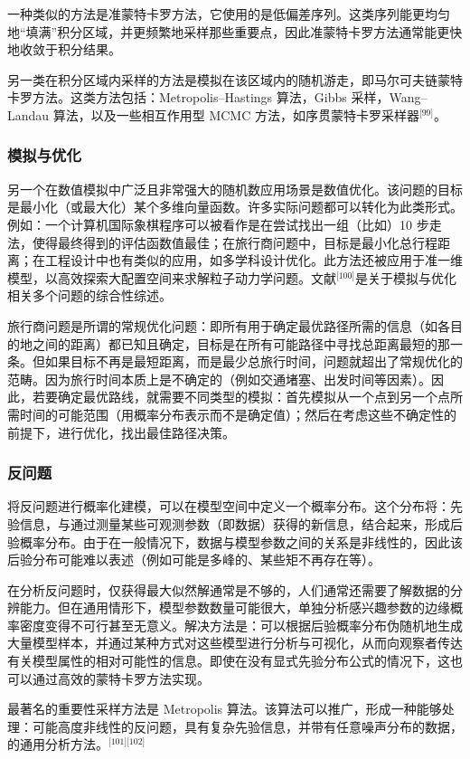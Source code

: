 一种类似的方法是准蒙特卡罗方法，它使用的是低偏差序列。这类序列能更均匀地“填满”积分区域，并更频繁地采样那些重要点，因此准蒙特卡罗方法通常能更快地收敛于积分结果。

另一类在积分区域内采样的方法是模拟在该区域内的随机游走，即马尔可夫链蒙特卡罗方法。这类方法包括：Metropolis–Hastings 算法，Gibbs 采样，Wang–Landau 算法，以及一些相互作用型 MCMC 方法，如序贯蒙特卡罗采样器\(^\text{[99]}\)。
\subsubsection{模拟与优化}
另一个在数值模拟中广泛且非常强大的随机数应用场景是数值优化。该问题的目标是最小化（或最大化）某个多维向量函数。许多实际问题都可以转化为此类形式。例如：一个计算机国际象棋程序可以被看作是在尝试找出一组（比如）10 步走法，使得最终得到的评估函数值最佳；在旅行商问题中，目标是最小化总行程距离；在工程设计中也有类似的应用，如多学科设计优化。此方法还被应用于准一维模型，以高效探索大配置空间来求解粒子动力学问题。文献\(^\text{[100]}\)是关于模拟与优化相关多个问题的综合性综述。

旅行商问题是所谓的常规优化问题：即所有用于确定最优路径所需的信息（如各目的地之间的距离）都已知且确定，目标是在所有可能路径中寻找总距离最短的那一条。但如果目标不再是最短距离，而是最少总旅行时间，问题就超出了常规优化的范畴。因为旅行时间本质上是不确定的（例如交通堵塞、出发时间等因素）。因此，若要确定最优路线，就需要不同类型的模拟：首先模拟从一个点到另一个点所需时间的可能范围（用概率分布表示而不是确定值）；然后在考虑这些不确定性的前提下，进行优化，找出最佳路径决策。
\subsubsection{反问题}
将反问题进行概率化建模，可以在模型空间中定义一个概率分布。这个分布将：先验信息，与通过测量某些可观测参数（即数据）获得的新信息，结合起来，形成后验概率分布。由于在一般情况下，数据与模型参数之间的关系是非线性的，因此该后验分布可能难以表述（例如可能是多峰的、某些矩不再存在等）。

在分析反问题时，仅获得最大似然解通常是不够的，人们通常还需要了解数据的分辨能力。但在通用情形下，模型参数数量可能很大，单独分析感兴趣参数的边缘概率密度变得不可行甚至无意义。解决方法是：可以根据后验概率分布伪随机地生成大量模型样本，并通过某种方式对这些模型进行分析与可视化，从而向观察者传达有关模型属性的相对可能性的信息。即使在没有显式先验分布公式的情况下，这也可以通过高效的蒙特卡罗方法实现。

最著名的重要性采样方法是 Metropolis 算法。该算法可以推广，形成一种能够处理：可能高度非线性的反问题，具有复杂先验信息，并带有任意噪声分布的数据，的通用分析方法。\(^\text{[101][102]}\)
